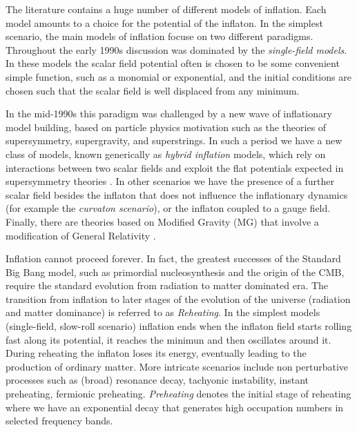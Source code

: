 \documentclass[11pt,a4paper,twoside]{book}
\begin{document}
The literature contains a huge number of different models of inflation. Each model amounts to a choice for the potential  of the inflaton. In the simplest scenario, the main models of inflation focuse on two different paradigms. Throughout the early 1990s discussion was dominated by the \textit{single-field models}. In these models the scalar field potential often is chosen to be some convenient simple function, such as a monomial or exponential, and the initial conditions are chosen such that the scalar field is well displaced from any minimum.

In the mid-1990s this paradigm was challenged by a new wave of inflationary model building, based on particle physics motivation such as the theories of supersymmetry, supergravity, and superstrings. In such a period we have a new class of models, known generically as \textit{hybrid inflation} models, which rely on interactions between two scalar fields and exploit the flat potentials expected in supersymmetry theories \cite{Liddle:intro}. 
In other scenarios we have the presence of a further scalar field besides the inflaton that does not influence the inflationary dynamics (for example the \textit{curvaton scenario}), or the inflaton coupled to a gauge field. Finally, there are theories based on Modified Gravity (MG) that involve a modification of General Relativity \cite{GWFromInflation:Intro}.

Inflation cannot proceed forever. In fact, the greatest successes of the Standard Big Bang model, such as primordial nucleosynthesis and the origin of the CMB, require the standard evolution from radiation to matter dominated era.
The transition from inflation to later stages of the evolution of the universe (radiation and matter dominance) is referred to as \textit{Reheating}. In the simplest models (single-field, slow-roll scenario) inflation ends when the inflaton field starts rolling fast along its potential, it reaches the minimun and then oscillates around it. During reheating the inflaton loses its energy, eventually leading to the production of ordinary matter.
 More intricate scenarios include non perturbative processes such as (broad) resonance decay, tachyonic instability, instant preheating, fermionic preheating. \textit{Preheating} denotes the initial stage of reheating where we have an exponential decay that generates high occupation numbers in selected frequency bands.  
 
\end{document}
